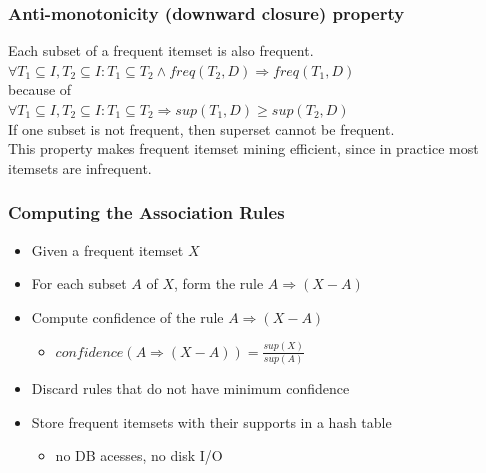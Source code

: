 \documentclass{article}
\begin{document}
\subsubsection{Anti-monotonicity (downward closure) property}
Each subset of a frequent itemset is also frequent. \\
$\forall T_1 \subseteq I, T_2 \subseteq I: T_1 \subseteq T_2 \land freq(T_2, D) \Rightarrow freq(T_1, D)$ \\
because of \\
$\forall T_1 \subseteq I, T_2 \subseteq I: T_1 \subseteq T_2 \Rightarrow sup(T_1, D) \ge sup(T_2, D)$ \\

If one subset is not frequent, then superset cannot be frequent. \\
This property makes frequent itemset mining efficient, since in practice most itemsets are infrequent. 

\subsubsection{Computing the Association Rules}
\begin{itemize}
  \item Given a frequent itemset $X$
  \item For each subset $A$ of $X$, form the rule $A \Rightarrow (X - A)$
  \item Compute confidence of the rule $A \Rightarrow (X - A)$
    \begin{itemize}
      \item $confidence(A \Rightarrow (X - A)) = \frac{sup(X)}{sup(A)}$ 
    \end{itemize}
  \item Discard rules that do not have minimum confidence
  \item Store frequent itemsets with their supports in a hash table
    \begin{itemize}
      \item no DB acesses, no disk I/O
    \end{itemize}
\end{itemize}
\end{document}
